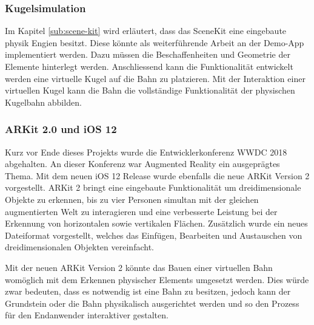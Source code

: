 \subsubsection{Kugelsimulation}
Im Kapitel \ref{sub:scene-kit} wird erläutert, dass das SceneKit eine eingebaute physik Engien besitzt. Diese könnte als weiterführende Arbeit an der Demo-App implementiert werden. Dazu müssen die Beschaffenheiten und Geometrie der Elemente hinterlegt werden. Anschliessend kann die Funktionalität entwickelt werden eine virtuelle Kugel auf die Bahn zu platzieren. Mit der Interaktion einer virtuellen Kugel kann die Bahn die vollständige Funktionalität der physischen Kugelbahn abbilden.

\subsubsection{ARKit 2.0 und iOS 12}
Kurz vor Ende dieses Projekts wurde die Entwicklerkonferenz WWDC 2018 abgehalten. An dieser Konferenz war Augmented Reality ein ausgeprägtes Thema. Mit dem neuen iOS 12 Release wurde ebenfalls die neue ARKit Version 2 vorgestellt. ARKit 2 bringt eine eingebaute Funktionalität um dreidimensionale Objekte zu erkennen, bis zu vier Personen simultan mit der gleichen augmentierten Welt zu interagieren und eine verbesserte Leistung bei der Erkennung von horizontalen sowie vertikalen Flächen. Zusätzlich wurde ein neues Dateiformat vorgestellt, welches das Einfügen, Bearbeiten und Austauschen von dreidimensionalen Objekten vereinfacht. 

Mit der neuen ARKit Version 2 könnte das Bauen einer virtuellen Bahn womöglich mit dem Erkennen physischer Elements umgesetzt werden. Dies würde zwar bedeuten, dass es notwendig ist eine Bahn zu besitzen, jedoch kann der Grundstein oder die Bahn physikalisch ausgerichtet werden und so den Prozess für den Endanwender interaktiver gestalten.
